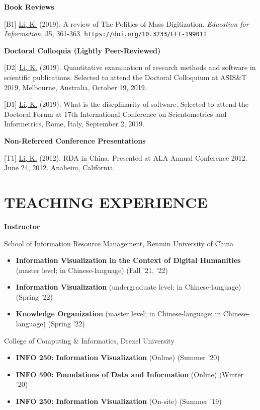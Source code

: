 \documentclass[margin, 10pt]{res} %
\begin{document}
\begin{resume}
\textbf{Book Reviews}

[B1] \underline{Li, K.} (2019). A review of The Politics of Mass Digitization. \textit{Education for Information}, 35, 361-363. \href{https://doi.org/10.3233/EFI-199011}{\nolinkurl{https://doi.org/10.3233/EFI-199011}}

\textbf{Doctoral Colloquia (Lightly Peer-Reviewed)}

[D2] \underline{Li, K.} (2019). Quantitative examination of research methods and software in scientific publications. Selected to attend the Doctoral Colloquium at ASIS\&T 2019, Melbourne, Australia, October 19, 2019.

[D1] \underline{Li, K.} (2019). What is the discplinarity of software. Selected to attend the Doctoral Forum at 17th International Conference on Scientometrics and Informetrics, Rome, Italy, September 2, 2019.

\textbf{Non-Refereed Conference Presentations}

[T1] \underline{Li, K.} (2012). RDA in China. Presented at ALA Annual Conference 2012. June 24, 2012. Anaheim, California.

\section{TEACHING EXPERIENCE}

\textbf{Instructor}

School of Information Resource Management, Renmin University of China
\begin{itemize}
\item \textbf{Information Visualization in the Context of Digital Humanities} (master level; in Chinese-language) (Fall '21, '22)
\item \textbf{Information Visualization} (undergraduate level; in Chinese-language) (Spring '22)
\item \textbf{Knowledge Organization} (master level; in Chinese-language; in Chinese-language) (Spring '22)
\end{itemize}

College of Computing \& Informatics, Drexel University

\begin{itemize}
\item \textbf{INFO 250: Information Visualization} (Online) (Summer '20)
\item \textbf{INFO 590: Foundations of Data and Information} (Online) (Winter '20)
\item \textbf{INFO 250: Information Visualization} (On-site) (Summer '19)
\end{itemize}


\end{resume}
\end{document}
